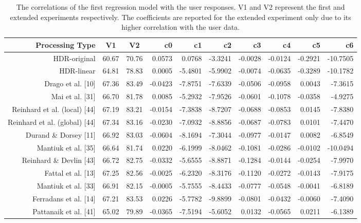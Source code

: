 \begin{sidewaystable}
\caption{The correlations of the first regression model with the user responses. V1 and V2 represent the first and
extended experiments respectively. The coefficients are reported for the extended experiment only due to its higher correlation with the user data.}
\centering
\begin{tabular}{r|c c || r r r r r r r}
\label{tab:correlation_triplet_model}
\textbf{Processing Type} & \textbf{V1} & \textbf{V2} & \textbf{c0} & \textbf{c1} & \textbf{c2} & \textbf{c3} & 
\textbf{c4} & \textbf{c5} & \textbf{c6}\\
\hline
HDR-original & 60.67 & 70.76 & 0.0573 & 0.0768 & -3.3241 & -0.0028 & -0.0124 & -0.2921 & -10.7505 \\
HDR-linear & 64.81 & 78.83 & 0.0005 & -5.4801 & -5.9902 & -0.0074 & -0.0635 & -0.3289 & -10.1782 \\
Drago et al. [10] & 67.36 & 83.49 & -0.0423 & -7.8751 & -7.6339 & -0.0506 & -0.0958 & 0.0043 & -7.3615 \\
Mai et al. [31] & 66.70 & 81.78 & 0.0085 & -5.2932 & -7.9526 & -0.0601 & -0.1078 & -0.0358 & -4.9275 \\
Reinhard et al. (local) [44] & 67.19 & 83.21 & -0.0154 & -7.3838 & -8.7207 & -0.0688 & -0.0853 & 0.0145 & -7.8380 \\
Reinhard et al. (global) [44] & 67.34 & 83.16 & -0.0230 & -7.0932 & -8.8856 & -0.0687 & -0.0783 & 0.0101 & -7.4470 \\
Durand \& Dorsey [11] & 66.92 & 83.03 & -0.0604 & -8.1694 & -7.3044 & -0.0977 & -0.0147 & 0.0082 & -6.8549 \\
Mantiuk et al. [35] & 66.64 & 81.74 & 0.0220 & -6.1999 & -8.0462 & -0.1081 & -0.0286 & -0.0102 & -10.0494 \\
Reinhard \& Devlin [43] & 66.72 & 82.75 & -0.0332 & -5.6555 & -8.8871 & -0.1284 & -0.0144 & -0.0254 & -7.9970 \\
Fattal et al. [13] & 67.25 & 82.56 & -0.0025 & -6.2320 & -8.3176 & -0.1120 & -0.0272 & -0.0143 & -7.9175 \\
Mantiuk et al. [33] & 66.91 & 82.15 & -0.0005 & -5.7555 & -8.4433 & -0.0777 & -0.0548 & -0.0041 & -6.8189 \\
Ferradans et al. [14] & 67.21 & 83.53 & 0.0226 & -5.7782 & -9.8899 & -0.0801 & -0.0432 & -0.0060 & -7.4090 \\
Pattanaik et al. [41] & 65.02 & 79.89 & -0.0365 & -7.5194 & -5.6052 & 0.0132 & -0.0565 & 0.0211 & -6.1389 \\
\end{tabular}
\end{sidewaystable}



